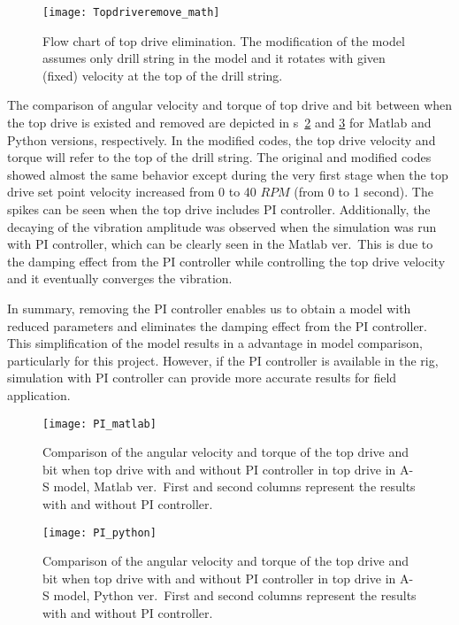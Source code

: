 \begin{figure}
  \centering
  \texttt{[image: Topdriveremove\_math]}
  \caption[Flow chart of top drive elimination]{Flow chart of top drive elimination. The modification of the model assumes only drill string in the model and it rotates with given (fixed) velocity at the top of the drill string.}\label{figure_Topdriveremove_math}
\end{figure}

The comparison of angular velocity and torque of top drive and bit between when the top drive is existed and removed are depicted in \figurename{}s~\ref{figure_topdriveremove_Matlab} and \ref{figure_topdriveremove} for Matlab and Python versions, respectively. In the modified codes, the top drive velocity and torque will refer to the top of the drill string. The original and modified codes showed almost the same behavior except during the very first stage when the top drive set point velocity increased from 0 to 40 $RPM$ (from 0 to 1 second). The spikes can be seen when the top drive includes PI controller. Additionally, the decaying of the vibration amplitude was observed when the simulation was run with PI controller, which can be clearly seen in the Matlab ver.\ This is due to the damping effect from the PI controller while controlling the top drive velocity and it eventually converges the vibration.

In summary, removing the PI controller enables us to obtain a model with reduced parameters and eliminates the damping effect from the PI controller. This simplification of the model results in a advantage in model comparison, particularly for this project. However, if the PI controller is available in the rig, simulation with PI controller can provide more accurate results for field application.
\begin{figure}
  \centering
  \texttt{[image: PI\_matlab]}
  \caption[Comparison between with and without top drive: Matlab ver]{Comparison of the angular velocity and torque of the top drive and bit when top drive with and without PI controller in top drive in A-S model, Matlab ver.\ First and second columns represent the results with and without PI controller.}\label{figure_topdriveremove_Matlab}
\end{figure}

\begin{figure}
  \centering
  \texttt{[image: PI\_python]}
  \caption[Comparison between with and without top drive: Python ver]{Comparison of the angular velocity and torque of the top drive and bit when top drive with and without PI controller in top drive in A-S model, Python ver.\ First and second columns represent the results with and without PI controller.}\label{figure_topdriveremove}
\end{figure}


